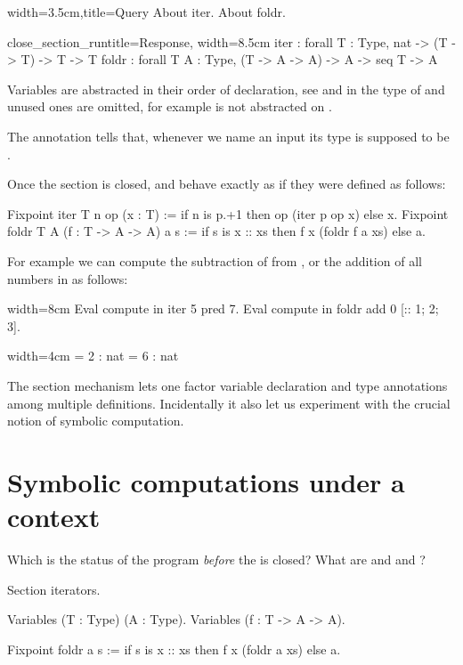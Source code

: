 \begin{coq}{}{width=3.5cm,title=Query}
About iter.
About foldr.
$~$
\end{coq}
\begin{coqout}{close_section_run}{title=Response, width=8.5cm}
iter : forall T : Type, nat -> (T -> T) -> T -> T
foldr :
  forall T A : Type, (T -> A -> A) -> A -> seq T -> A
\end{coqout}

Variables are abstracted in their order of declaration, see  and 
in the type of  and unused ones are omitted, for example 
is not abstracted on .

The  annotation tells \Coq{} that, whenever we name
an input  its type is supposed to be .

Once the section is closed,  and  behave exactly as
if they were defined as follows:

\begin{coq}{}{}
Fixpoint iter T n op (x : T) :=
  if n is p.+1 then op (iter p op x) else x.
Fixpoint foldr T A (f : T -> A -> A) a s :=
  if s is x :: xs then f x (foldr f a xs) else a.
\end{coq}

For example we can compute the subtraction of  from , or the 
addition of all numbers in \C{[:: 1; 2; 3]}
as follows:

\begin{coq}{}{width=8cm}
Eval compute in iter 5 pred 7.
Eval compute in foldr add 0 [:: 1; 2; 3].
\end{coq}
\begin{coqout}{}{width=4cm}
 = 2 : nat
 = 6 : nat
\end{coqout}

The section mechanism lets one factor variable declaration and type
annotations among multiple definitions.  Incidentally it also let us
experiment with the crucial notion of symbolic computation.

\section{Symbolic computations under a context}

Which is the status of the  program \emph{before} the
 is closed?  What are  and  and ?

\begin{coq}{}{}
Section iterators.

Variables (T : Type) (A : Type).
Variables (f : T -> A -> A).

Fixpoint foldr a s :=
  if s is x :: xs then f x (foldr a xs) else a.
\end{coq}

